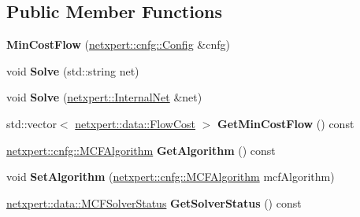 \subsection*{Public Member Functions}
\begin{DoxyCompactItemize}
\item 
{\bfseries Min\+Cost\+Flow} (\hyperlink{structnetxpert_1_1cnfg_1_1Config}{netxpert\+::cnfg\+::\+Config} \&cnfg)\hypertarget{classnetxpert_1_1MinCostFlow_ac130d7426b4d84a02373e51454fdc63f}{}\label{classnetxpert_1_1MinCostFlow_ac130d7426b4d84a02373e51454fdc63f}

\item 
void {\bfseries Solve} (std\+::string net)\hypertarget{classnetxpert_1_1MinCostFlow_a818d05c0b2b1e517e65b7670c3e3ad75}{}\label{classnetxpert_1_1MinCostFlow_a818d05c0b2b1e517e65b7670c3e3ad75}

\item 
void {\bfseries Solve} (\hyperlink{classnetxpert_1_1InternalNet}{netxpert\+::\+Internal\+Net} \&net)\hypertarget{classnetxpert_1_1MinCostFlow_a62aeea837ffdb2c659a0ac741d64137b}{}\label{classnetxpert_1_1MinCostFlow_a62aeea837ffdb2c659a0ac741d64137b}

\item 
std\+::vector$<$ \hyperlink{structnetxpert_1_1data_1_1FlowCost}{netxpert\+::data\+::\+Flow\+Cost} $>$ {\bfseries Get\+Min\+Cost\+Flow} () const \hypertarget{classnetxpert_1_1MinCostFlow_a245a11fd055d104bade19bc44ca415d5}{}\label{classnetxpert_1_1MinCostFlow_a245a11fd055d104bade19bc44ca415d5}

\item 
\hyperlink{namespacenetxpert_1_1cnfg_aae922390a89b0c9af1bc2532428c5ef9}{netxpert\+::cnfg\+::\+M\+C\+F\+Algorithm} {\bfseries Get\+Algorithm} () const \hypertarget{classnetxpert_1_1MinCostFlow_acca2bc1d079cf8de208fffb02a92a49f}{}\label{classnetxpert_1_1MinCostFlow_acca2bc1d079cf8de208fffb02a92a49f}

\item 
void {\bfseries Set\+Algorithm} (\hyperlink{namespacenetxpert_1_1cnfg_aae922390a89b0c9af1bc2532428c5ef9}{netxpert\+::cnfg\+::\+M\+C\+F\+Algorithm} mcf\+Algorithm)\hypertarget{classnetxpert_1_1MinCostFlow_abf6a79a9451ae557338fb72c29813897}{}\label{classnetxpert_1_1MinCostFlow_abf6a79a9451ae557338fb72c29813897}

\item 
\hyperlink{namespacenetxpert_1_1data_a0ea30f651c6cc7e7a6edd5a5cbe6346c}{netxpert\+::data\+::\+M\+C\+F\+Solver\+Status} {\bfseries Get\+Solver\+Status} () const \hypertarget{classnetxpert_1_1MinCostFlow_ab87f6c58a8173823296fcb3529947495}{}\label{classnetxpert_1_1MinCostFlow_ab87f6c58a8173823296fcb3529947495}


\end{DoxyCompactItemize}

